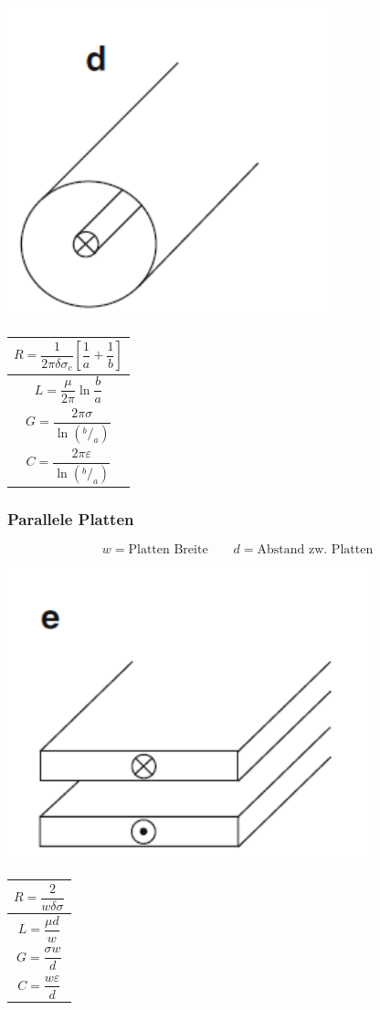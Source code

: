 \includegraphics[width=0.4\columnwidth]{Figures/Koaxialleitung.png}
{\renewcommand*{\arraystretch}{0.2}
    \begin{tabularx}{0.5\columnwidth}{|X|}
        \hline
        \[R=\frac{1}{2\pi\delta\sigma_c}\left[\frac{1}{a}+\frac{1}{b}\right]\] \\
        \hline
        \[L=\frac{\mu}{2\pi}\ln\frac{b}{a}\]                                   \\
        \hline
        \[G=\frac{2\pi\sigma}{\ln(^b/_a)}\]                                    \\
        \hline
        \[C=\frac{2\pi\varepsilon}{\ln(^b/_a)}\]                               \\
        \hline
    \end{tabularx}}

\subsubsection{Parallele Platten}
\[
    w  = \text{Platten Breite} \qquad d  = \text{Abstand zw. Platten}
\]

\includegraphics[width=0.4\columnwidth]{Figures/Parallele_Platten.png}
{\renewcommand*{\arraystretch}{0.2}
    \begin{tabularx}{0.5\columnwidth}{|X|}
        \hline
        \[R=\frac{2}{w\delta\sigma}\] \\
        \hline
        \[L=\frac{\mu d}{w}\]         \\
        \hline
        \[G=\frac{\sigma w}{d}\]      \\
        \hline
        \[C=\frac{w\varepsilon}{d}\]  \\
        \hline
    \end{tabularx}}

